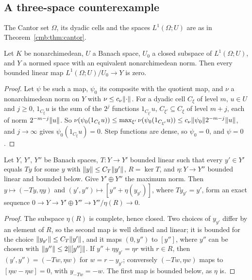 \subsection{A three-space counterexample}\label{ocl:ssec:three-space}

The Cantor set $\Omega$, its dyadic cells and the spaces $L^1(\Omega;U)$ are as in Theorem~\ref{cmb:thm:cantor}.

\begin{lemma}\label{ocl:lem:no-operators}
Let $K$ be nonarchimedean, $U$ a Banach space, $U_0$ a closed subspace of $L^1(\Omega;U)$, and $Y$ a normed space with
an equivalent nonarchimedean norm. Then every bounded linear map $L^1(\Omega;U)/U_0\to Y$ is zero.
\end{lemma}

\begin{proof}
Let $\psi$ be such a map, $\psi_0$ its composite with the quotient map, and $\nu$ a nonarchimedean norm on $Y$ with
$\nu\le c_\nu\lVert \cdot\rVert$. For a dyadic cell $C_\xi$ of level $m$, $u\in U$ and $j\ge0$, $1_{C_\xi}u$ is the sum of the
$2^j$ functions $1_{C_{\xi'}}u$, $C_{\xi'}\subseteq C_\xi$ of level $m+j$, each of norm $2^{-m-j}\lVert u\rVert$. So
$\nu(\psi_0(1_{C_\xi}u))\le\max_{\xi'}\nu(\psi_0(1_{C_{\xi'}}u))\le c_\nu\lVert \psi_0\rVert2^{-m-j}\lVert u\rVert$, and $j\to\infty$
gives $\psi_0(1_{C_\xi}u)=0$. Step functions are dense, so $\psi_0=0$, and $\psi=0$.
\end{proof}

\begin{lemma}\label{ocl:lem:dilution}
Let $Y$, $Y'$, $Y''$ be Banach spaces, $T\colon Y\to Y'$ bounded linear such that every $y'\in Y'$ equals $Ty$ for some
$y$ with $\lVert y\rVert\le C_T\lVert y'\rVert$, $R=\ker T$, and $\eta\colon Y\to Y''$ bounded linear and bounded below. Give
$Y'\oplus Y''$ the maximum norm. Then $y\mapsto(-Ty,\eta y)$ and $(y',y'')\mapsto[y''+\eta(y_{y'})]$, where
$Ty_{y'}=y'$, form an exact sequence $0\to Y\to Y'\oplus Y''\to Y''/\eta(R)\to0$.
\end{lemma}

\begin{proof}
The subspace $\eta(R)$ is complete, hence closed. Two choices of $y_{y'}$ differ by an element of $R$, so the second
map is well defined and linear; it is bounded for the choice $\lVert y_{y'}\rVert\le C_T\lVert y'\rVert$, and it maps $(0,y'')$ to
$[y'']$, where $y''$ can be chosen with $\lVert y''\rVert\le2\lVert [y'']\rVert$. If $y''+\eta y_{y'}=\eta r$ with $r\in R$, then
$(y',y'')=(-Tw,\eta w)$ for $w=r-y_{y'}$; conversely $(-Tw,\eta w)$ maps to $[\eta w-\eta w]=0$, with $y_{-Tw}=-w$.
The first map is bounded below, as $\eta$ is.
\end{proof}

